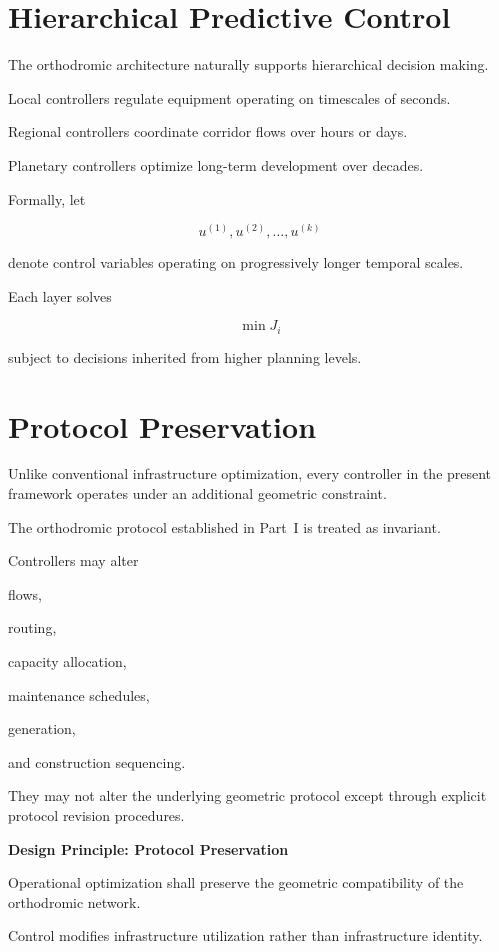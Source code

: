 \documentclass[11pt,fleqn]{book}
\numberwithin{equation}{chapter}
\newenvironment{principle}[1]
  {\begin{principleEnv}
   \noindent\textbf{Design Principle: #1}\par\smallskip\itshape}
  {\end{principleEnv}}
\theoremstyle{plain}
\theoremstyle{definition}
\theoremstyle{remark}
\begin{document}

\section{Hierarchical Predictive Control}

The orthodromic architecture naturally supports hierarchical decision
making.

Local controllers regulate equipment operating on timescales of seconds.

Regional controllers coordinate corridor flows over hours or days.

Planetary controllers optimize long-term development over decades.

Formally, let

\[
u^{(1)},
u^{(2)},
\ldots,
u^{(k)}
\]

denote control variables operating on progressively longer temporal
scales.

Each layer solves

\[
\min
J_i
\]

subject to decisions inherited from higher planning levels.


\section{Protocol Preservation}

Unlike conventional infrastructure optimization, every controller in the
present framework operates under an additional geometric constraint.

The orthodromic protocol established in Part~I is treated as invariant.

Controllers may alter

flows,

routing,

capacity allocation,

maintenance schedules,

generation,

and construction sequencing.

They may not alter the underlying geometric protocol except through
explicit protocol revision procedures.


\begin{principle}{Protocol Preservation}

Operational optimization shall preserve the geometric compatibility of
the orthodromic network.

Control modifies infrastructure utilization rather than infrastructure
identity.

\end{principle}
\end{document}
